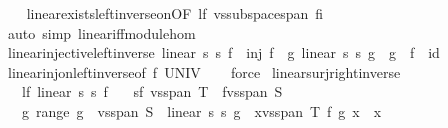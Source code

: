 \begin{isabellebody}
%
\isadelimproof
\ \ %
\endisadelimproof
%
\isatagproof
{}\isamarkupfalse%
\ linear{\isacharunderscore}{\kern0pt}exists{\isacharunderscore}{\kern0pt}left{\isacharunderscore}{\kern0pt}inverse{\isacharunderscore}{\kern0pt}on{\isacharbrackleft}{\kern0pt}OF\ lf\ vs{}{\isachardot}{\kern0pt}subspace{\isacharunderscore}{\kern0pt}span\ fi{\isacharbrackright}{\kern0pt}\isanewline
\ \ \isamarkupfalse%
\ {\isacharparenleft}{\kern0pt}auto\ simp{\isacharcolon}{\kern0pt}\ linear{\isacharunderscore}{\kern0pt}iff{\isacharunderscore}{\kern0pt}module{\isacharunderscore}{\kern0pt}hom{\isacharparenright}{\kern0pt}%
\endisatagproof
{\isafoldproof}%
%
\isadelimproof
\isanewline
%
\endisadelimproof
\isanewline
{}\isamarkupfalse%
\ linear{\isacharunderscore}{\kern0pt}injective{\isacharunderscore}{\kern0pt}left{\isacharunderscore}{\kern0pt}inverse{\isacharcolon}{\kern0pt}\ {\isachardoublequoteopen}linear\ s{}\ s{}\ f\ {\isasymLongrightarrow}\ inj\ f\ {\isasymLongrightarrow}\ {\isasymexists}g{\isachardot}{\kern0pt}\ linear\ s{}\ s{}\ g\ {\isasymand}\ g\ {\isasymcirc}\ f\ {\isacharequal}{\kern0pt}\ id{\isachardoublequoteclose}\isanewline
%
\isadelimproof
\ \ %
\endisadelimproof
%
\isatagproof
{}\isamarkupfalse%
\ linear{\isacharunderscore}{\kern0pt}inj{\isacharunderscore}{\kern0pt}on{\isacharunderscore}{\kern0pt}left{\isacharunderscore}{\kern0pt}inverse{\isacharbrackleft}{\kern0pt}of\ f\ UNIV{\isacharbrackright}{\kern0pt}\isanewline
\ \ \isamarkupfalse%
\ force%
\endisatagproof
{\isafoldproof}%
%
\isadelimproof
\isanewline
%
\endisadelimproof
\isanewline
{}\isamarkupfalse%
\ linear{\isacharunderscore}{\kern0pt}surj{\isacharunderscore}{\kern0pt}right{\isacharunderscore}{\kern0pt}inverse{\isacharcolon}{\kern0pt}\isanewline
\ \ \ lf{\isacharcolon}{\kern0pt}\ {\isachardoublequoteopen}linear\ s{}\ s{}\ f{\isachardoublequoteclose}\isanewline
\ \ \ sf{\isacharcolon}{\kern0pt}\ {\isachardoublequoteopen}vs{}{\isachardot}{\kern0pt}span\ T\ {\isasymsubseteq}\ f{\isacharbackquote}{\kern0pt}vs{}{\isachardot}{\kern0pt}span\ S{\isachardoublequoteclose}\isanewline
\ \ \ {\isachardoublequoteopen}{\isasymexists}g{\isachardot}{\kern0pt}\ range\ g\ {\isasymsubseteq}\ vs{}{\isachardot}{\kern0pt}span\ S\ {\isasymand}\ linear\ s{}\ s{}\ g\ {\isasymand}\ {\isacharparenleft}{\kern0pt}{\isasymforall}x{\isasymin}vs{}{\isachardot}{\kern0pt}span\ T{\isachardot}{\kern0pt}\ f\ {\isacharparenleft}{\kern0pt}g\ x{\isacharparenright}{\kern0pt}\ {\isacharequal}{\kern0pt}\ x{\isacharparenright}{\kern0pt}{\isachardoublequoteclose}\isanewline

\end{isabellebody}
